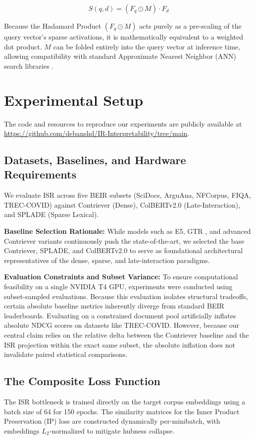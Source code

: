 \documentclass[sigconf,authordraft]{acmart}
\begin{document}
\begin{equation}
S(q,d) = (F_q \odot M) \cdot F_d
\end{equation}

Because the Hadamard Product $(F_q \odot M)$ acts purely as a pre-scaling of the query vector's sparse activations, it is mathematically equivalent to a weighted dot product. $M$ can be folded entirely into the query vector at inference time, allowing compatibility with standard Approximate Nearest Neighbor (ANN) search libraries \cite{johnson2019}.

\section{Experimental Setup}
The code and resources to reproduce our experiments are publicly available at \url{https://github.com/debanshd/IR-Interpretability/tree/main}.

\subsection{Datasets, Baselines, and Hardware Requirements}
We evaluate ISR across five BEIR subsets \cite{thakur2021} (SciDocs, ArguAna, NFCorpus, FIQA, TREC-COVID) against Contriever (Dense), ColBERTv2.0 \cite{khattab2020} (Late-Interaction), and SPLADE \cite{formal2021} (Sparse Lexical).

\textbf{Baseline Selection Rationale:} While models such as E5, GTR \cite{wang2022}, and advanced Contriever variants continuously push the state-of-the-art, we selected the base Contriever, SPLADE, and ColBERTv2.0 to serve as foundational architectural representatives of the dense, sparse, and late-interaction paradigms.

\textbf{Evaluation Constraints and Subset Variance:} To ensure computational feasibility on a single NVIDIA T4 GPU, experiments were conducted using subset-sampled evaluations. Because this evaluation isolates structural tradeoffs, certain absolute baseline metrics inherently diverge from standard BEIR leaderboards. Evaluating on a constrained document pool artificially inflates absolute NDCG scores on datasets like TREC-COVID. However, because our central claim relies on the relative delta between the Contriever baseline and the ISR projection within the exact same subset, the absolute inflation does not invalidate paired statistical comparisons.

\subsection{The Composite Loss Function}
The ISR bottleneck is trained directly on the target corpus embeddings using a batch size of 64 for 150 epochs. The similarity matrices for the Inner Product Preservation (IP) loss are constructed dynamically per-minibatch, with embeddings $L_2$-normalized to mitigate hubness collapse.
\end{document}
